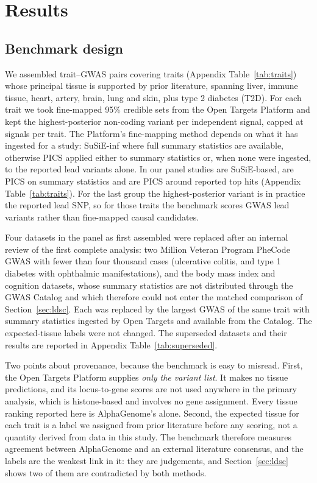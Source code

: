 \documentclass[11pt]{article}
\begin{document}
\section{Results}

\subsection{Benchmark design}\label{sec:design}

We assembled \NTRAITS{} trait--GWAS pairs covering \NUNIQUE{} traits (Appendix Table~\ref{tab:traits}) whose principal tissue
is supported by prior literature, spanning liver, immune tissue, heart, artery, brain,
lung and skin, plus type 2 diabetes (T2D). For each trait we took fine-mapped 95\%
credible sets from the Open Targets Platform \citep{buniello2025opentargets} and kept the
highest-posterior non-coding variant per independent signal, capped at \NCAP{} signals
per trait. The Platform's fine-mapping method depends on what it has ingested for a
study: SuSiE-inf \citep{wang2020susie} where full summary statistics are available,
otherwise PICS applied either to summary statistics or, when none were ingested, to the
reported lead variants alone. In our panel \NSUSIE{} studies are SuSiE-based,
\NPICSSUM{} are PICS on summary statistics and \NPICSTOP{} are PICS around reported top
hits (Appendix Table~\ref{tab:traits}). For the last group the highest-posterior variant
is in practice the reported lead SNP, so for those traits the benchmark scores GWAS lead
variants rather than fine-mapped causal candidates.

Four datasets in the panel as first assembled were replaced after an internal review of
the first complete analysis: two Million Veteran Program PheCode GWAS with fewer than four
thousand cases (ulcerative colitis, and type 1 diabetes with ophthalmic manifestations),
and the body mass index and cognition datasets, whose summary statistics are not
distributed through the GWAS Catalog and which therefore could not enter the matched
comparison of Section~\ref{sec:ldsc}. Each was replaced by the largest GWAS of the same
trait with summary statistics ingested by Open Targets and available from the Catalog.
The expected-tissue labels were not changed. The superseded datasets and their results
are reported in Appendix Table~\ref{tab:superseded}.

Two points about provenance, because the benchmark is easy to misread. First, the Open
Targets Platform supplies \emph{only the variant list}. It makes no tissue predictions,
and its locus-to-gene scores are not used anywhere in the primary analysis, which is
histone-based and involves no gene assignment. Every tissue ranking reported here is
AlphaGenome's alone. Second, the expected tissue for each trait is a label we assigned
from prior literature before any scoring, not a quantity derived from data in this study.
The benchmark therefore measures agreement between AlphaGenome and an external
literature consensus, and the labels are the weakest link in it: they are judgements, and
Section~\ref{sec:ldsc} shows two of them are contradicted by both methods.
\end{document}
